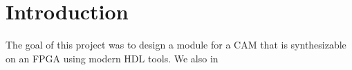 \section{Introduction}
The goal of this project was to design a module for a CAM that is synthesizable on an FPGA using modern HDL tools. 
We also in